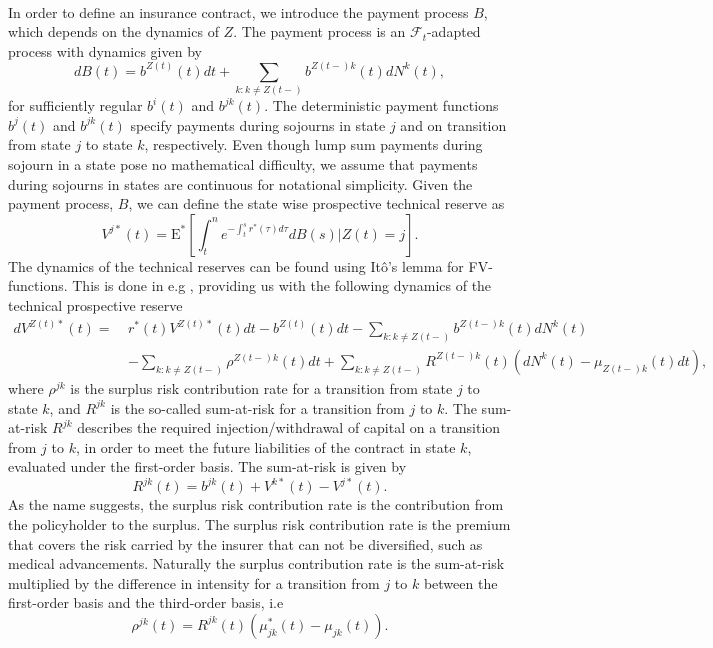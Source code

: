 \documentclass[12pt]{article}
\newcommand{\E}{\text{E}}
\theoremstyle{my_thm}
\theoremstyle{my_rem}
\begin{document}
\\
In order to define an insurance contract, we introduce the payment process $B$, which depends on the dynamics of $Z$. The payment process is an $\mathcal{F}_t$-adapted process with dynamics given by
$$
dB(t)=b^{Z(t)}(t) dt +\sum_{k:k \neq Z(t-)} b^{Z(t-)k}(t)dN^k(t),
$$
for sufficiently regular $b^i(t)$ and $b^{jk}(t)$. The deterministic payment functions $b^j(t)$ and $b^{jk}(t)$ specify payments during sojourns in state $j$ and on transition from state $j$ to state $k$, respectively. Even though lump sum payments during sojourn in a state pose no mathematical difficulty, we assume that payments during sojourns in states are continuous for notational simplicity. Given the payment process, $B$, we can define the state wise prospective technical reserve as
$$
V^{j*}(t)=\E^*\left[ \int_t^n  e^{-\int_t^s r^*(\tau) d\tau} dB(s) |Z(t)=j \right].
$$
The dynamics of the technical reserves can be found using Itô's lemma for FV-functions. This is done in e.g \citep{RaI}, providing us with the following dynamics of the technical prospective reserve
\begin{align}
dV^{Z(t)*}(t)= \
&
r^*(t)V^{Z(t)*}(t)dt - b^{Z(t)}(t)dt -\sum_{k:k\neq Z(t-)}b^{Z(t-)k}(t) dN^k(t)\nonumber
\\
&-\sum_{k:k\neq Z(t-)} \rho^{Z(t-)k}(t) dt
+
\sum_{k:k\neq Z(t-)} R^{Z(t-)k}(t)(dN^k(t)-\mu_{Z(t-)k}(t) dt), \label{eq:AAP}
\end{align}
where $\rho^{jk}$ is the surplus risk contribution rate for a transition from state $j$ to state $k$, and $R^{jk}$ is the so-called sum-at-risk for a transition from $j$ to $k$. The sum-at-risk $R^{jk}$ describes the required injection/withdrawal of capital on a transition from $j$ to $k$, in order to meet the future liabilities of the contract in state $k$, evaluated under the first-order basis. The sum-at-risk is given by
$$
R^{jk}(t)=b^{jk}(t)+V^{k*}(t)-V^{j*}(t).
$$
As the name suggests, the surplus risk contribution rate is the contribution from the policyholder to the surplus. The surplus risk contribution rate is the premium that covers the risk carried by the insurer that can not be diversified, such as medical advancements. Naturally the surplus contribution rate is the sum-at-risk multiplied by the difference in intensity for a transition from $j$ to $k$ between the first-order basis and the third-order basis, i.e
$$
\rho^{jk}(t)=R^{jk}(t)(\mu^*_{jk}(t)-\mu_{jk}(t)).
$$
\end{document}
